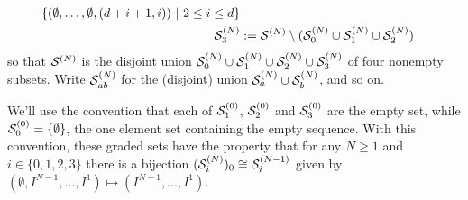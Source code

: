 \documentclass[10pt]{article}
\begin{document}
\begin{CalculatingRepeatedKoszul}
\begin{alignat*}{2}
\{(\emptyset,\ldots,\emptyset,(d+i+1,i))\ |\ 2\leq i\leq d\}\\
\mathcal{S}^{(N)}_3&:=\mathcal{S}^{(N)}\setminus(\mathcal{S}^{(N)}_0 \cup\mathcal{S}^{(N)}_1\cup \mathcal{S}^{(N)}_2)
\end{alignat*}
so that $\mathcal{S}^{(N)}$ is the disjoint union $\mathcal{S}^{(N)}_0\cup\mathcal{S}^{(N)}_1\cup \mathcal{S}^{(N)}_2\cup\mathcal{S}^{(N)}_3$ of four nonempty subsets. Write $\mathcal{S}^{(N)}_{ab}$ for the (disjoint) union $\mathcal{S}^{(N)}_{a}\cup\mathcal{S}^{(N)}_{b}$, and so on.

We'll use the convention that each of $\mathcal{S}^{(0)}_1$, $\mathcal{S}^{(0)}_2$ and $\mathcal{S}^{(0)}_3$ are the empty set, while $\mathcal{S}^{(0)}_0=\{\emptyset\}$, the one element set containing the empty sequence.
With this convention, these graded sets have the property that for any $N\geq1$ and $i\in\{0,1,2,3\}$ there is a bijection $(\mathcal{S}^{(N)}_i)_0\cong\mathcal{S}^{(N-1)}_i$ given by $(\emptyset,I^{N-1},\ldots,I^1)\mapsto(I^{N-1},\ldots,I^1)$.



\end{CalculatingRepeatedKoszul}
\end{document}
